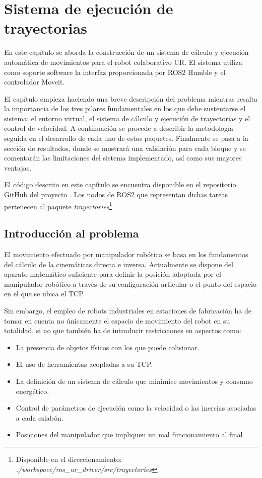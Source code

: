 \chapter{Sistema de ejecución de trayectorias}
\label{cap: trayectorias}

En este capítulo se aborda la construcción de un sistema de cálculo y ejecución automática de movimientos para el robot colaborativo UR. El sistema utiliza como soporte software la interfaz proporcionada por ROS2 Humble y el controlador Moveit. 

El capítulo empieza haciendo una breve descripción del problema mientras resalta la importancia de los tres pilares fundamentales en los que debe sustentarse el sistema: el entorno virtual, el sistema de cálculo y ejecución de trayectorias y el control de velocidad. A continuación se procede a describir la metodología seguida en el desarrollo de cada uno de estos paquetes. Finalmente se pasa a la sección de resultados, donde se mostrará una validación para cada bloque y se comentarán las limitaciones del sistema implementado, así como sus mayores ventajas.

El código descrito en este capítulo se encuentra disponible en el repositorio GitHub del proyecto \cite{repo_github_TFM_MiguelLerinAlonso}. Los nodos de ROS2 que representan dichas tareas pertenecen al paquete \textit{trayectories}\footnote{Disponible en el direccionamiento: \textit{./workspace/ros\_ur\_driver/src/trayectories}}

\section{Introducción al problema}
El movimiento efectuado por manipulador robótico se basa en los fundamentos del cálculo de la cinemáticas directa e inversa. Actualmente se dispone del aparato matemático suficiente para definir la posición adoptada por el manipulador robótico a través de su configuración articular o el punto del espacio en el que se ubica el \acrshort{TCP}.

Sin embargo, el empleo de robots industriales en estaciones de fabricación ha de tomar en cuenta no únicamente el espacio de movimiento del robot en su totalidad, si no que también ha de introducir restricciones en aspectos como:
\begin{itemize}
    \item La presencia de objetos físicos con los que puede colisionar.
    \item El uso de herramientas acopladas a su \acrshort{TCP}.
    \item La definición de un sistema de cálculo que minimice movimientos y consumo energético.
    \item Control de parámetros de ejecución como la velocidad o las inercias asociadas a cada eslabón.
    \item Posiciones del manipulador que impliquen un mal funcionamiento al final
\end{itemize}

